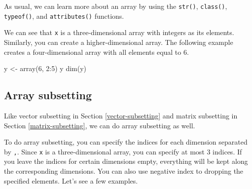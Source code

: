 \documentclass[
]{book}
\newenvironment{Shaded}{\begin{snugshade}}{\end{snugshade}}
\newcommand{\CommentTok}[1]{\textcolor[rgb]{0.56,0.35,0.01}{\textit{#1}}}
\newcommand{\DecValTok}[1]{\textcolor[rgb]{0.00,0.00,0.81}{#1}}
\newcommand{\FunctionTok}[1]{\textcolor[rgb]{0.00,0.00,0.00}{#1}}
\newcommand{\NormalTok}[1]{#1}
\newcommand{\OtherTok}[1]{\textcolor[rgb]{0.56,0.35,0.01}{#1}}
\newcommand{\SpecialCharTok}[1]{\textcolor[rgb]{0.00,0.00,0.00}{#1}}
\begin{document}
As usual, we can learn more about an array by using the \texttt{str()}, \texttt{class()}, \texttt{typeof()}, and \texttt{attributes()} functions.

\begin{Shaded}
\end{Shaded}

We can see that \texttt{x} is a three-dimensional array with integers as its elements. Similarly, you can create a higher-dimensional array. The following example creates a four-dimensional array with all elements equal to 6.

\begin{Shaded}
\begin{Highlighting}[]
\NormalTok{y }\OtherTok{\textless{}{-}} \FunctionTok{array}\NormalTok{(}\DecValTok{6}\NormalTok{, }\DecValTok{2}\SpecialCharTok{:}\DecValTok{5}\NormalTok{)}
\NormalTok{y}
\FunctionTok{dim}\NormalTok{(y)}
\end{Highlighting}
\end{Shaded}

\hypertarget{array-subsetting}{%
\subsection{Array subsetting}\label{array-subsetting}}

Like vector subsetting in Section \ref{vector-subsetting} and matrix subsetting in Section \ref{matrix-subsetting}, we can do array subsetting as well.

To do array subsetting, you can specify the indices for each dimension separated by \texttt{,}. Since \texttt{x} is a three-dimensional array, you can specify at most 3 indices. If you leave the indices for certain dimensions empty, everything will be kept along the corresponding dimensions. You can also use negative index to dropping the specified elements. Let's see a few examples.
\end{document}

